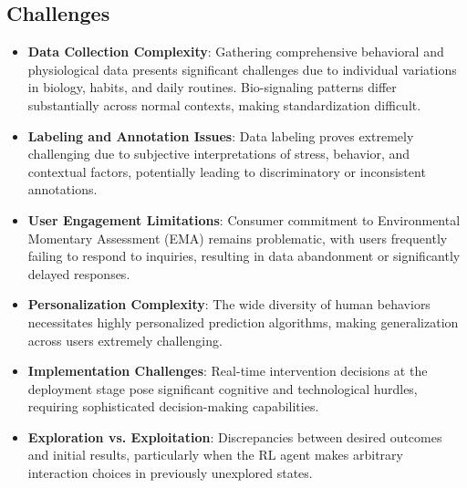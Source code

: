 \subsection*{Challenges}
\begin{itemize}
    \item \textbf{Data Collection Complexity}: Gathering comprehensive behavioral and physiological data presents significant challenges due to individual variations in biology, habits, and daily routines. Bio-signaling patterns differ substantially across normal contexts, making standardization difficult.
    \item \textbf{Labeling and Annotation Issues}: Data labeling proves extremely challenging due to subjective interpretations of stress, behavior, and contextual factors, potentially leading to discriminatory or inconsistent annotations.
    \item \textbf{User Engagement Limitations}: Consumer commitment to Environmental Momentary Assessment (EMA) remains problematic, with users frequently failing to respond to inquiries, resulting in data abandonment or significantly delayed responses.
    \item \textbf{Personalization Complexity}: The wide diversity of human behaviors necessitates highly personalized prediction algorithms, making generalization across users extremely challenging.
    \item \textbf{Implementation Challenges}: Real-time intervention decisions at the deployment stage pose significant cognitive and technological hurdles, requiring sophisticated decision-making capabilities.
    \item \textbf{Exploration vs. Exploitation}: Discrepancies between desired outcomes and initial results, particularly when the RL agent makes arbitrary interaction choices in previously unexplored states.
\end{itemize}

